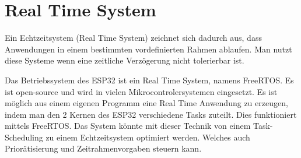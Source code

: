 \section[Real Time System]{Real Time System\authorkatrin} \label{RTOS}
Ein Echtzeitsystem (Real Time System) zeichnet sich dadurch aus, dass Anwendungen in einem 
bestimmten vordefinierten Rahmen ablaufen. Man nutzt diese Systeme wenn eine zeitliche Verzögerung 
nicht tolerierbar ist. 
\par\vspace{1em}
\noindent
Das Betriebssystem des ESP32 ist ein Real Time System, namens FreeRTOS. Es ist open-source und wird in vielen 
Mikrocontrolersystemen eingesetzt. Es ist möglich aus einem eigenen Programm eine Real Time Anwendung zu erzeugen, indem man 
den 2 Kernen des ESP32 verschiedene Tasks zuteilt. Dies funktioniert mittels FreeRTOS.
Das System könnte mit dieser Technik von einem Task-Scheduling zu einem Echtzeitsystem optimiert werden. Welches auch Priorätisierung und 
Zeitrahmenvorgaben steuern kann. \cite{freertos_esp_idf} \cite{echtzeitsystem_heinen_elektronik} 